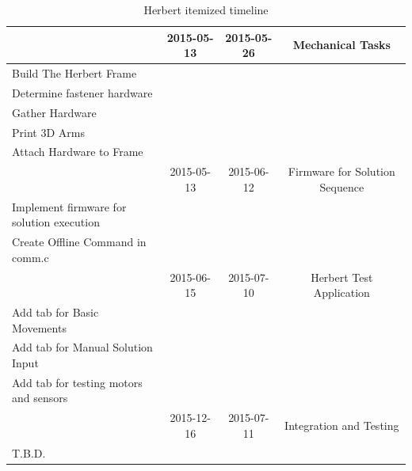 \documentclass[11pt,english]{article}
\begin{document}
\begin{table}[!ht]
{\begin{tabular}{|l|c|c|c|}
\textbf{}                                 & 2015-05-13     & 2015-05-26      & Mechanical Tasks                   \\ \hline
Build The Herbert Frame                   &                &                 &                                    \\ \hline
Determine fastener hardware               &                &                 &                                    \\ \hline
Gather Hardware                           &                &                 &                                    \\ \hline
Print 3D Arms                             &                &                 &                                    \\ \hline
Attach Hardware to Frame                  &                &                 &                                    \\ \hline
\textbf{}                                 & 2015-05-13     & 2015-06-12      & Firmware for Solution Sequence     \\ \hline
Implement firmware for solution execution &                &                 &                                    \\ \hline
Create Offline Command in comm.c          &                &                 &                                    \\ \hline
\textbf{}                                 & 2015-06-15     & 2015-07-10      & Herbert Test Application           \\ \hline
Add tab for Basic Movements               &                &                 &                                    \\ \hline
Add tab for Manual Solution Input         &                &                 &                                    \\ \hline
Add tab for testing motors and sensors    &                &                 &                                    \\ \hline
                                          & 2015-12-16     & 2015-07-11      & Integration and Testing            \\ \hline
T.B.D.                                    &                &                 &                                    \\ \hline
\end{tabular}}
\caption{Herbert itemized timeline}
\label{table:herbert timeline}
\end{table}
\end{document}
